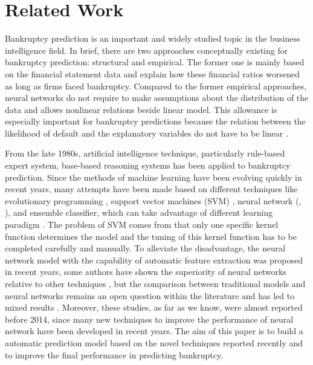\section{Related Work}

Bankruptcy prediction is an important and widely studied topic in the business intelligence field. In brief, there are two approaches conceptually existing for bankruptcy prediction: structural and empirical. The former one is mainly based on the financial statement data and explain how these financial ratios worsened as long as firms faced bankruptcy. Compared to the former empirical approaches, neural networks do not require to make assumptions about the distribution of the data and allows nonlinear relations beside linear model. This allowance is especially important for bankruptcy predictions because the relation between the likelihood of default and the explanatory variables do not have to be linear \cite{iturriaga2015bankruptcy}.

From the late 1980s, artificial intelligence technique, particularly rule-based expert system, base-based reasoning systems has been applied to bankruptcy prediction. Since the methods of machine learning have been evolving quickly in recent years, many attempts have been made based on different techniques like evolutionary programming \cite{zhang2013rule}, support vector machines (SVM) \cite{shin2005application}, neural network (\cite{kittler1998combining}, \cite{angelini2008neural}), and ensemble classifier, which can take advantage of different learning paradigm \cite{chen2015higgs}. The problem of SVM comes from that only one specific kernel function determines the model and the tuning of this kernel function has to be completed carefully and manually. To alleviate the disadvantage, the neural network model with the capability of automatic feature extraction was proposed in recent years, some authors have shown the superiority of neural networks relative to other techniques \cite{lee2013multi}, but the comparison between traditional models and neural networks remains an open question within the literature and has led to mixed results \cite{bernhardsen2001model}.  Moreover, these studies, as far as we know, were almost reported before 2014, since many new techniques to improve the performance of neural network have been developed in recent years. The aim of this paper is to build a automatic prediction model based on the novel techniques reported recently and to improve the final performance in predicting bankruptcy. 